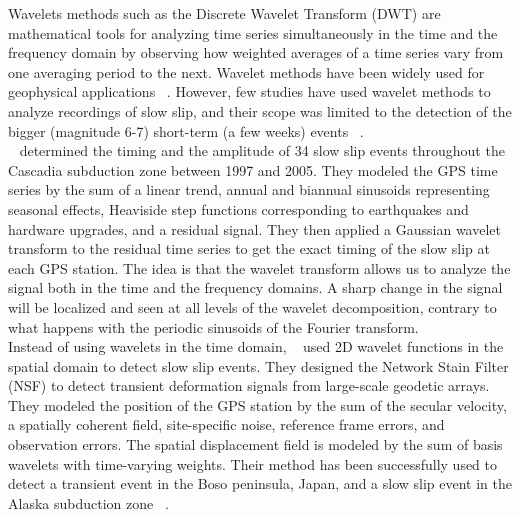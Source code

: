 \documentclass{article}
\begin{document}
Wavelets methods such as the Discrete Wavelet Transform (DWT) are mathematical tools for analyzing time series simultaneously in the time and the frequency domain by observing how weighted averages of a time series vary from one averaging period to the next. Wavelet methods have been widely used for geophysical applications ~\citep{KUM_1997}. However, few studies have used wavelet methods to analyze recordings of slow slip, and their scope was limited to the detection of the bigger (magnitude 6-7) short-term (a few weeks) events ~\citep{SZE_2008,OHT_2010,WEI_2012,ALB_2019}. \\

~\citet{SZE_2008} determined the timing and the amplitude of 34 slow slip events throughout the Cascadia subduction zone between 1997 and 2005. They modeled the GPS time series by the sum of a linear trend, annual and biannual sinusoids representing seasonal effects, Heaviside step functions corresponding to earthquakes and hardware upgrades, and a residual signal. They then applied a Gaussian wavelet transform to the residual time series to get the exact timing of the slow slip at each GPS station. The idea is that the wavelet transform allows us to analyze the signal both in the time and the frequency domains. A sharp change in the signal will be localized and seen at all levels of the wavelet decomposition, contrary to what happens with the periodic sinusoids of the Fourier transform. \\

Instead of using wavelets in the time domain, ~\citet{OHT_2010} used 2D wavelet functions in the spatial domain to detect slow slip events. They designed the Network Stain Filter (NSF) to detect transient deformation signals from large-scale geodetic arrays. They modeled the position of the GPS station by the sum of the secular velocity, a spatially coherent field, site-specific noise, reference frame errors, and observation errors. The spatial displacement field is modeled by the sum of basis wavelets with time-varying weights.  Their method has been successfully used to detect a transient event in the Boso peninsula, Japan, and a slow slip event in the Alaska subduction zone ~\citep{WEI_2012}. \\
\end{document}
